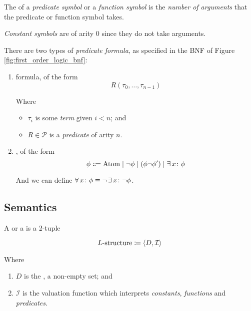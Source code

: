 \begin{definition}[Arity]
    The  of a \textit{predicate symbol} or a 
    \textit{function symbol} is the \textit{number of arguments} that the 
    predicate or function symbol takes.
    
    \textit{Constant symbols} are of arity $0$ since they do not take arguments.
\end{definition}

\begin{definition}
    There are two types of \textit{predicate formula}, as specified in the BNF 
    of Figure \ref{fig:first_order_logic_bnf}:
    
    \begin{enumerate}
        \item {} formula, of the form
            \begin{equation}
                R(\tau_0, \ldots, \tau_{n-1})
            \end{equation}
            
            Where
            \begin{itemize}
                \item $\tau_{i}$ is some \textit{term} given $i < n$; and
                \item $R \in \mathcal{P}$ is a \textit{predicate} of arity $n$.
            \end{itemize}
        \item {}, of the form
            \begin{equation}
                \phi \Coloneqq \mathrm{Atom} 
                    \mid \neg \phi 
                    \mid ( \phi \neg \phi' )
                    \mid \operatorname{\exists} x \colon \phi
            \end{equation}
            
            And we can define
            $\operatorname{\forall} x \colon \phi\equiv \neg \operatorname{\exists} x \colon \neg \phi$.
    \end{enumerate}
\end{definition}

\subsection{Semantics}

\begin{definition}[$L$-Structure]
    A  or a  is a 2-tuple
    
    \begin{equation}
        L\text{-structure} \coloneqq \langle {D, \mathcal{I}} \rangle
    \end{equation}
    
    Where
    \begin{enumerate}
        \item $D$ is the , a non-empty set; and
        \item $\mathcal{I}$ is the valuation function which interprets
            \textit{constants}, \textit{functions} and \textit{predicates}.
    \end{enumerate}
\end{definition}

